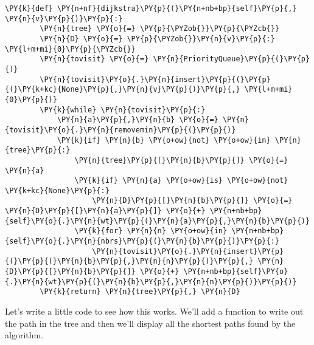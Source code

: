 \begin{Verbatim}[commandchars=\\\{\}]
    \PY{k}{def} \PY{n+nf}{dijkstra}\PY{p}{(}\PY{n+nb+bp}{self}\PY{p}{,} \PY{n}{v}\PY{p}{)}\PY{p}{:}
        \PY{n}{tree} \PY{o}{=} \PY{p}{\PYZob{}}\PY{p}{\PYZcb{}}
        \PY{n}{D} \PY{o}{=} \PY{p}{\PYZob{}}\PY{n}{v}\PY{p}{:} \PY{l+m+mi}{0}\PY{p}{\PYZcb{}}
        \PY{n}{tovisit} \PY{o}{=} \PY{n}{PriorityQueue}\PY{p}{(}\PY{p}{)}
        \PY{n}{tovisit}\PY{o}{.}\PY{n}{insert}\PY{p}{(}\PY{p}{(}\PY{k+kc}{None}\PY{p}{,}\PY{n}{v}\PY{p}{)}\PY{p}{,} \PY{l+m+mi}{0}\PY{p}{)}
        \PY{k}{while} \PY{n}{tovisit}\PY{p}{:}
            \PY{n}{a}\PY{p}{,}\PY{n}{b} \PY{o}{=} \PY{n}{tovisit}\PY{o}{.}\PY{n}{removemin}\PY{p}{(}\PY{p}{)}
            \PY{k}{if} \PY{n}{b} \PY{o+ow}{not} \PY{o+ow}{in} \PY{n}{tree}\PY{p}{:}
                \PY{n}{tree}\PY{p}{[}\PY{n}{b}\PY{p}{]} \PY{o}{=} \PY{n}{a}
                \PY{k}{if} \PY{n}{a} \PY{o+ow}{is} \PY{o+ow}{not} \PY{k+kc}{None}\PY{p}{:}
                    \PY{n}{D}\PY{p}{[}\PY{n}{b}\PY{p}{]} \PY{o}{=} \PY{n}{D}\PY{p}{[}\PY{n}{a}\PY{p}{]} \PY{o}{+} \PY{n+nb+bp}{self}\PY{o}{.}\PY{n}{wt}\PY{p}{(}\PY{n}{a}\PY{p}{,}\PY{n}{b}\PY{p}{)}
                \PY{k}{for} \PY{n}{n} \PY{o+ow}{in} \PY{n+nb+bp}{self}\PY{o}{.}\PY{n}{nbrs}\PY{p}{(}\PY{n}{b}\PY{p}{)}\PY{p}{:}
                    \PY{n}{tovisit}\PY{o}{.}\PY{n}{insert}\PY{p}{(}\PY{p}{(}\PY{n}{b}\PY{p}{,}\PY{n}{n}\PY{p}{)}\PY{p}{,} \PY{n}{D}\PY{p}{[}\PY{n}{b}\PY{p}{]} \PY{o}{+} \PY{n+nb+bp}{self}\PY{o}{.}\PY{n}{wt}\PY{p}{(}\PY{n}{b}\PY{p}{,}\PY{n}{n}\PY{p}{)}\PY{p}{)}
        \PY{k}{return} \PY{n}{tree}\PY{p}{,} \PY{n}{D}
\end{Verbatim}



Let's write a little code to see how this works.
We'll add a function to write out the path in the tree and then we'll display all the shortest paths found by the algorithm.

